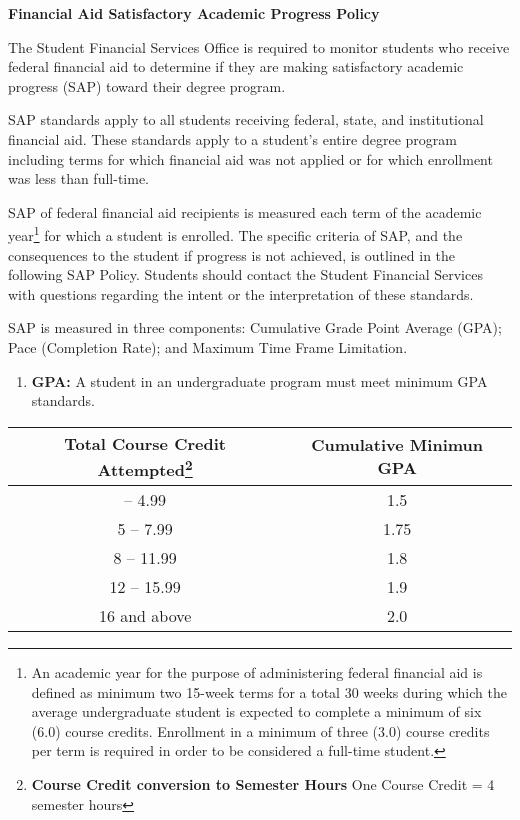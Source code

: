 \documentclass[
  letterpaper,
]{scrbook}
\providecommand{\tightlist}{%
  \setlength{\itemsep}{0pt}\setlength{\parskip}{0pt}}
\renewcommand\toprule[2]\relax
\renewcommand\bottomrule[2]\relax
\begin{document}
\textbf{Financial Aid Satisfactory Academic Progress Policy}

The Student Financial Services Office is required to monitor students
who receive federal financial aid to determine if they are making
satisfactory academic progress (SAP) toward their degree program.

SAP standards apply to all students receiving federal, state, and
institutional financial aid. These standards apply to a student's entire
degree program including terms for which financial aid was not applied
or for which enrollment was less than full-time.

SAP of federal financial aid recipients is measured each term of the
academic year\footnote{An academic year for the purpose of administering
  federal financial aid is defined as minimum two 15-week terms for a
  total 30 weeks during which the average undergraduate student is
  expected to complete a minimum of six (6.0) course credits. Enrollment
  in a minimum of three (3.0) course credits per term is required in
  order to be considered a full-time student.} for which a student is
enrolled. The specific criteria of SAP, and the consequences to the
student if progress is not achieved, is outlined in the following SAP
Policy. Students should contact the Student Financial Services with
questions regarding the intent or the interpretation of these standards.

SAP is measured in three components: Cumulative Grade Point Average
(GPA); Pace (Completion Rate); and Maximum Time Frame Limitation.

\begin{enumerate}
\def\labelenumi{\arabic{enumi}.}
\tightlist
\item
  \textbf{GPA:} A student in an undergraduate program must meet minimum
  GPA standards.
\end{enumerate}

\begin{longtable}[]{@{}cc@{}}
\toprule\noalign{}
Total Course Credit Attempted\footnote{\textbf{Course Credit conversion
  to Semester Hours} One Course Credit = 4 semester hours} & Cumulative
Minimun GPA \\
\midrule\noalign{}
\endhead
\bottomrule\noalign{}
\endlastfoot
0 -- 4.99 & 1.5 \\
5 -- 7.99 & 1.75 \\
8 -- 11.99 & 1.8 \\
12 -- 15.99 & 1.9 \\
16 and above & 2.0 \\
\end{longtable}
\end{document}
